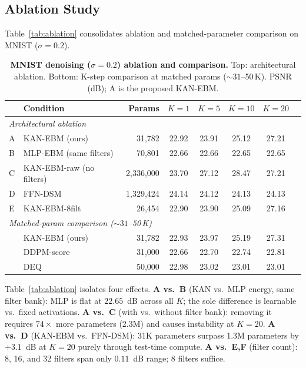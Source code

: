 \documentclass{article}
\begin{document}
\subsection{Ablation Study}

Table~\ref{tab:ablation} consolidates ablation and matched-parameter comparison on MNIST ($\sigma{=}0.2$).

\begin{table}[ht]
\centering\small
\caption{%
  \textbf{MNIST denoising ($\sigma{=}0.2$) ablation and comparison.}
  Top: architectural ablation. Bottom: K-step comparison at matched params (${\sim}31$--50\,K).
  PSNR (dB); A is the proposed KAN-EBM.
}
\label{tab:ablation}
\label{tab:main}
\label{tab:comparison}
\begin{tabular}{llrccccc}
\toprule
& Condition & Params & $K{=}1$ & $K{=}5$ & $K{=}10$ & $K{=}20$ \\
\midrule
\multicolumn{7}{l}{\emph{Architectural ablation}} \\
A & KAN-EBM (ours)           &  31,782 & 22.92 & 23.91 & 25.12 & 27.21 \\
B & MLP-EBM (same filters)   &  70,801 & 22.66 & 22.66 & 22.65 & 22.65 \\
C & KAN-EBM-raw (no filters) &2,336,000& 23.70 & 27.12 & 28.47 & 27.21 \\
D & FFN-DSM                  &1,329,424& 24.14 & 24.12 & 24.13 & 24.13 \\
E & KAN-EBM-8filt            &  26,454 & 22.90 & 23.90 & 25.09 & 27.16 \\
\midrule
\multicolumn{7}{l}{\emph{Matched-param comparison (${\sim}31$--50\,K)}} \\
 & KAN-EBM (ours)            &  31,782 & 22.93 & 23.97 & 25.19 & 27.31 \\
 & DDPM-score                &  31,000 & 22.66 & 22.70 & 22.74 & 22.81 \\
 & DEQ                       &  50,000 & 22.98 & 23.02 & 23.01 & 23.01 \\
\bottomrule
\end{tabular}
\end{table}

Table~\ref{tab:ablation} isolates four effects.
\textbf{A vs.\ B} (KAN vs.\ MLP energy, same filter bank): MLP is flat at $22.65$~dB
across all $K$; the sole difference is learnable vs.\ fixed activations.
\textbf{A vs.\ C} (with vs.\ without filter bank): removing it requires $74\times$
more parameters (2.3M) and causes instability at $K{=}20$.
\textbf{A vs.\ D} (KAN-EBM vs.\ FFN-DSM): 31K parameters surpass 1.3M parameters
by $+3.1$~dB at $K{=}20$ purely through test-time compute.
\textbf{A vs.\ E,F} (filter count): 8, 16, and 32 filters span only $0.11$~dB range;
8 filters suffice.
\end{document}
